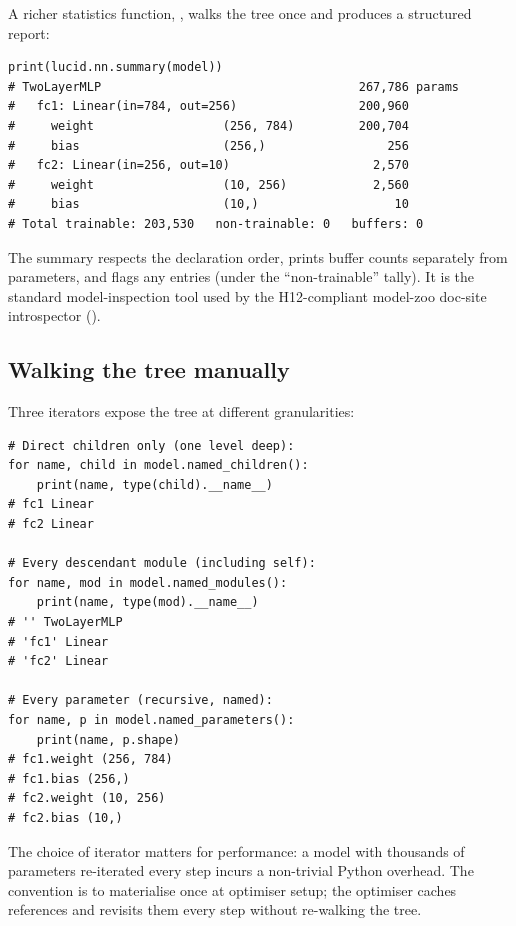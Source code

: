 A richer statistics function, ,
walks the tree once and produces a structured report:

\begin{lstlisting}[style=lucid,language=LucidPython]
print(lucid.nn.summary(model))
# TwoLayerMLP                                    267,786 params
#   fc1: Linear(in=784, out=256)                 200,960
#     weight                  (256, 784)         200,704
#     bias                    (256,)                 256
#   fc2: Linear(in=256, out=10)                    2,570
#     weight                  (10, 256)            2,560
#     bias                    (10,)                   10
# Total trainable: 203,530   non-trainable: 0   buffers: 0
\end{lstlisting}

The summary respects the declaration order, prints buffer
counts separately from parameters, and flags any
 entries (under the
``non-trainable'' tally). It is the standard model-inspection
tool used by the H12-compliant model-zoo doc-site introspector
().

\subsection{Walking the tree manually}
\label{ssec:module_system:walking_tree}

Three iterators expose the tree at different granularities:

\begin{lstlisting}[style=lucid,language=LucidPython]
# Direct children only (one level deep):
for name, child in model.named_children():
    print(name, type(child).__name__)
# fc1 Linear
# fc2 Linear

# Every descendant module (including self):
for name, mod in model.named_modules():
    print(name, type(mod).__name__)
# '' TwoLayerMLP
# 'fc1' Linear
# 'fc2' Linear

# Every parameter (recursive, named):
for name, p in model.named_parameters():
    print(name, p.shape)
# fc1.weight (256, 784)
# fc1.bias (256,)
# fc2.weight (10, 256)
# fc2.bias (10,)
\end{lstlisting}

The choice of iterator matters for performance: a model with
thousands of parameters re-iterated every step incurs a
non-trivial Python overhead. The convention is to materialise
 once at optimiser setup; the
optimiser caches references and revisits them every step
without re-walking the tree.

